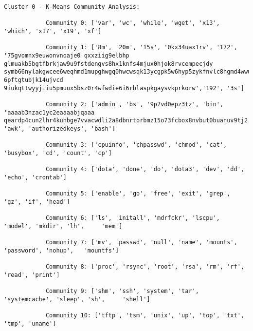     \begin{lstlisting}[caption={Cluster 0 - K-Means Community Analysis}, label={lst:cluster-0-k-means-community-analysis}]
            Cluster 0 - K-Means Community Analysis:

            Community 0: ['var', 'wc', 'while', 'wget', 'x13', 'which', 'x17', 'x19', 'xf']

            Community 1: ['8m', '20m', '15s', '0kx34uax1rv', '172', '75gvomnx9euwonvnoaje0 qxxziig9elbhp glmuakb5bgtfbrkjaw9u9fstdengvs8hx1knfs4mjux0hjok8rvcempecjdy symb66nylakgwcee6weqhmd1mupghwgq0hwcwsqk13ycgpk5w6hyp5zykfnvlc8hgmd4wwu97k 6pftgtubjk14ujvcd 9iukqttwyyjiiu5pmuux5bsz0r4wfwdie6i6rblaspkgaysvkprkorw','192', '3s']

            Community 2: ['admin', 'bs', '9p7vd0epz3tz', 'bin', 'aaaab3nzac1yc2eaaaabjqaaa qeardp4cun2lhr4kuhbge7vvacwdli2a8dbnrtorbmz15o73fcbox8nvbut0buanuv9tj2',   'awk', 'authorizedkeys', 'bash']

            Community 3: ['cpuinfo', 'chpasswd', 'chmod', 'cat', 'busybox', 'cd', 'count', 'cp']

            Community 4: ['dota', 'done', 'do', 'dota3', 'dev', 'dd', 'echo', 'crontab']

            Community 5: ['enable', 'go', 'free', 'exit', 'grep', 'gz', 'if', 'head']

            Community 6: ['ls', 'initall', 'mdrfckr', 'lscpu', 'model', 'mkdir', 'lh',     'mem']

            Community 7: ['mv', 'passwd', 'null', 'name', 'mounts', 'password', 'nohup',   'mountfs']

            Community 8: ['proc', 'rsync', 'root', 'rsa', 'rm', 'rf', 'read', 'print']

            Community 9: ['shm', 'ssh', 'system', 'tar', 'systemcache', 'sleep', 'sh',     'shell']

            Community 10: ['tftp', 'tsm', 'unix', 'up', 'top', 'txt', 'tmp', 'uname']
            
    \end{lstlisting}
    
